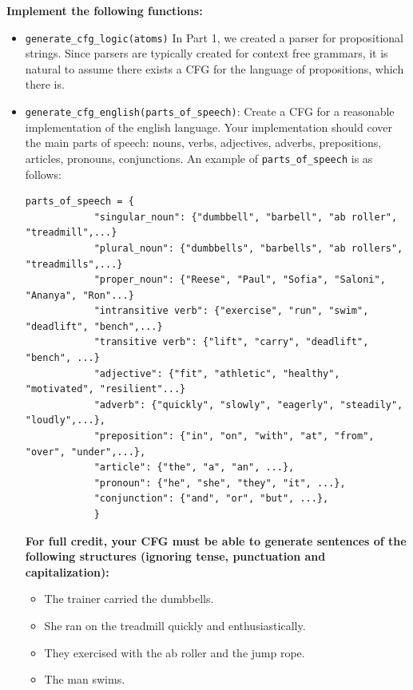 \documentclass{article}
\begin{document}
    
\begin{tcolorbox}[enhanced,interior style={top color=Dandelion!20,bottom color=Dandelion!30}]
    \textbf{Implement the following functions:}

    \begin{itemize}
        \item \lstinline{generate_cfg_logic(atoms)} In Part 1, we created a parser for propositional strings. Since parsers are typically created for context free grammars, it is natural to assume there exists a CFG for the language of propositions, which there is.
        \item
        \lstinline{generate_cfg_english(parts_of_speech)}: Create a CFG for a reasonable implementation of the english language.
        Your implementation should cover the main parts of speech: nouns, verbs, adjectives, adverbs, prepositions, articles, pronouns, conjunctions. An example of \lstinline{parts_of_speech} is as follows:
        \begin{lstlisting}[belowskip=-10pt]
        parts_of_speech = {
            "singular_noun": {"dumbbell", "barbell", "ab roller", "treadmill",...}
            "plural_noun": {"dumbbells", "barbells", "ab rollers", "treadmills",...}
            "proper_noun": {"Reese", "Paul", "Sofia", "Saloni", "Ananya", "Ron"...}
            "intransitive verb": {"exercise", "run", "swim", "deadlift", "bench",...}
            "transitive verb": {"lift", "carry", "deadlift", "bench", ...}
            "adjective": {"fit", "athletic", "healthy", "motivated", "resilient"...}
            "adverb": {"quickly", "slowly", "eagerly", "steadily", "loudly",...},
            "preposition": {"in", "on", "with", "at", "from", "over", "under",...},
            "article": {"the", "a", "an", ...},
            "pronoun": {"he", "she", "they", "it", ...},
            "conjunction": {"and", "or", "but", ...},
            }
            \end{lstlisting}
            \textbf{For full credit, your CFG must be able to generate sentences of the following structures (ignoring tense, punctuation and capitalization):}
            \begin{itemize}
                \item The trainer carried the dumbbells.
                \item She ran on the treadmill quickly and enthusiastically.
                \item They exercised with the ab roller and the jump rope.
                \item The man swims.

\end{itemize}
\end{itemize}
\end{tcolorbox}
\end{document}
